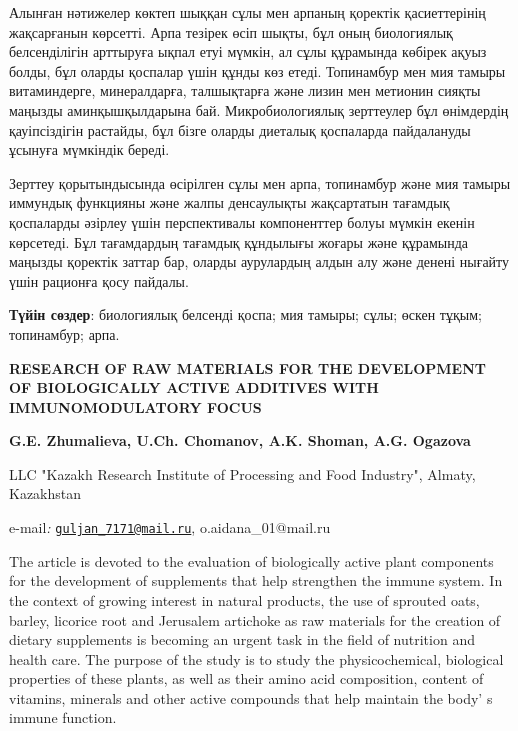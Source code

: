 Алынған нәтижелер көктеп шыққан сұлы мен арпаның қоректік қасиеттерінің
жақсарғанын көрсетті. Арпа тезірек өсіп шықты, бұл оның биологиялық
белсенділігін арттыруға ықпал етуі мүмкін, ал сұлы құрамында көбірек
ақуыз болды, бұл оларды қоспалар үшін құнды көз етеді. Топинамбур мен
мия тамыры витаминдерге, минералдарға, талшықтарға және лизин мен
метионин сияқты маңызды аминқышқылдарына бай. Микробиологиялық
зерттеулер бұл өнімдердің қауіпсіздігін растайды, бұл бізге оларды
диеталық қоспаларда пайдалануды ұсынуға мүмкіндік береді.

Зерттеу қорытындысында өсірілген сұлы мен арпа, топинамбур және мия
тамыры иммундық функцияны және жалпы денсаулықты жақсартатын тағамдық
қоспаларды әзірлеу үшін перспективалы компоненттер болуы мүмкін екенін
көрсетеді. Бұл тағамдардың тағамдық құндылығы жоғары және құрамында
маңызды қоректік заттар бар, оларды аурулардың алдын алу және денені
нығайту үшін рационға қосу пайдалы.

{\bfseries Түйін сөздер}: биологиялық белсенді қоспа; мия тамыры; сұлы;
өскен тұқым; топинамбур; арпа.

\begin{articleheader}
{\bfseries RESEARCH OF RAW MATERIALS FOR THE DEVELOPMENT OF BIOLOGICALLY
ACTIVE ADDITIVES WITH IMMUNOMODULATORY FOCUS}

{\bfseries
G.E. Zhumalieva\textsuperscript{\envelope },
U.Ch. Chomanov,
A.K. Shoman,
A.G. Ogazova\textsuperscript{\envelope }
}
\end{articleheader}

\begin{affiliation}
LLC "Kazakh Research Institute of Processing and Food Industry", Almaty,
Kazakhstan

e-mail\emph{:}
\href{mailto:guljan_7171@mail.ru}{\nolinkurl{guljan\_7171@mail.ru}},
o.aidana\_01@mail.ru
\end{affiliation}

The article is devoted to the evaluation of biologically active plant
components for the development of supplements that help strengthen the
immune system. In the context of growing interest in natural products,
the use of sprouted oats, barley, licorice root and Jerusalem artichoke
as raw materials for the creation of dietary supplements is becoming an
urgent task in the field of nutrition and health care. The purpose of
the study is to study the physicochemical, biological properties of
these plants, as well as their amino acid composition, content of
vitamins, minerals and other active compounds that help maintain the
body' s immune function.

